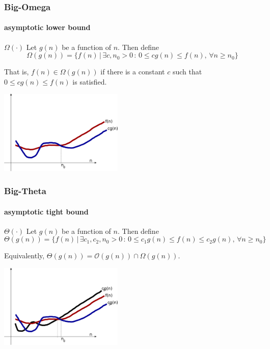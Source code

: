 \documentclass[10pt]{beamer}
\newcommand{\mO}{{\mathcal{O}}}
\begin{document}
\begin{frame}
\frametitle{Big-Omega}
\framesubtitle{asymptotic lower bound}
\begin{block}{$\Omega(\cdot)$}
Let $g(n)$ be a function of $n$.  Then define
\begin{equation*}
  \Omega(g(n)) = \{f(n)\,|\, \exists c,n_0>0 \,:\, 0\leq cg(n) \leq f(n),\, \forall n\geq n_0\}
\end{equation*}

That is, $f(n)\in \Omega(g(n))$ if there is a constant $c$ such that $0\leq cg(n) \leq f(n)$ is satisfied.
\end{block}
\begin{center}
  \includegraphics[height=4cm]{./figs/bigo_2}
\end{center}
\end{frame}
\begin{frame}
\frametitle{Big-Theta}
\framesubtitle{asymptotic tight bound}
\begin{block}{$\Theta(\cdot)$}
Let $g(n)$ be a function of $n$.  Then define
\begin{equation*}
  \Theta(g(n)) = \{f(n)\,|\, \exists c_1,c_2,n_0>0 \,:\, 0\leq c_1g(n) \leq
f(n)\leq c_2 g(n),\, \forall
n\geq n_0\}
\end{equation*}

Equivalently, $\Theta(g(n)) = \mO(g(n)) \cap \Omega(g(n))$.
\end{block}

\begin{center}
  \includegraphics[height=4cm]{./figs/bigo_3}
\end{center}
\end{frame}
\end{document}
